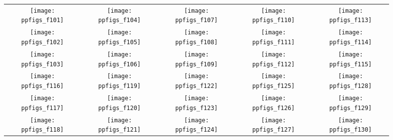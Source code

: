 \documentclass[conference]{IEEEtran}
\newcommand{\ERT}{\ensuremath{\mathrm{ERT}}}
\begin{document}
\begin{figure*}
\centering
\begin{tabular}{@{}c@{}c@{}c@{}c@{}c@{}}
\texttt{[image: ppfigs\_f101]}&
\texttt{[image: ppfigs\_f104]}&
\texttt{[image: ppfigs\_f107]}&
\texttt{[image: ppfigs\_f110]}&
\texttt{[image: ppfigs\_f113]}\\
\texttt{[image: ppfigs\_f102]}&
\texttt{[image: ppfigs\_f105]}&
\texttt{[image: ppfigs\_f108]}&
\texttt{[image: ppfigs\_f111]}&
\texttt{[image: ppfigs\_f114]}\\
\texttt{[image: ppfigs\_f103]}&
\texttt{[image: ppfigs\_f106]}&
\texttt{[image: ppfigs\_f109]}&
\texttt{[image: ppfigs\_f112]}&
\texttt{[image: ppfigs\_f115]}\\
\texttt{[image: ppfigs\_f116]}&
\texttt{[image: ppfigs\_f119]}&
\texttt{[image: ppfigs\_f122]}&
\texttt{[image: ppfigs\_f125]}&
\texttt{[image: ppfigs\_f128]}\\
\texttt{[image: ppfigs\_f117]}&
\texttt{[image: ppfigs\_f120]}&
\texttt{[image: ppfigs\_f123]}&
\texttt{[image: ppfigs\_f126]}&
\texttt{[image: ppfigs\_f129]}\\
\texttt{[image: ppfigs\_f118]}&
\texttt{[image: ppfigs\_f121]}&
\texttt{[image: ppfigs\_f124]}&
\texttt{[image: ppfigs\_f127]}&
\texttt{[image: ppfigs\_f130]}
\end{tabular}
\caption[Expected running time (\ERT) divided by dimension
versus dimension in log-log presentation]{\label{fig:scaling}%
}
\end{figure*}
\end{document}
